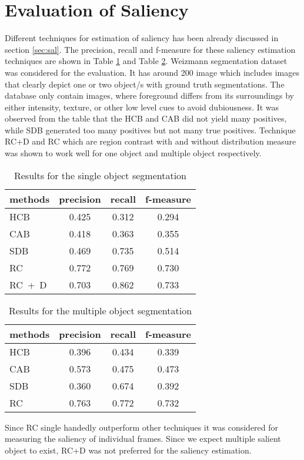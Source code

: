 \section{Evaluation of Saliency}
\label{sec:EvS}
Different techniques for estimation of saliency has been already discussed in section \ref{sec:sal}.  The precision, recall and f-measure for these saliency estimation techniques are shown in Table \ref{tab:salOneObj} and Table \ref{tab:salTwoObj}.  Weizmann segmentation dataset was considered for the evaluation.  It has around 200 image which includes images that clearly depict one or two object/s with ground truth segmentations. The database only contain images, where foreground differs from its surroundings by either intensity, texture, or other low level cues to avoid dubiousness.
It was observed from the table that the HCB and CAB did not yield many positives, while SDB generated too many positives but not many true positives. Technique RC+D and RC which are region contrast with and without distribution measure was shown to work well for one object and multiple object respectively.
\begin{table}[htbp]
   \caption{Results for the single object segmentation}
   \begin{center}
   \begin{tabular}{|l|c|c|c|} \hline
     methods & precision & recall & f-measure \\ \hline
     HCB & 0.425 & 0.312 & 0.294 \\
	 CAB & 0.418 & 0.363 & 0.355 \\
 	 SDB & 0.469 & 0.735 & 0.514 \\
	 RC  & 0.772 & 0.769 & 0.730 \\
	 RC~+~D & 0.703	& 0.862 & 0.733	\\ \hline
   \end{tabular}
   \label{tab:salOneObj}
   \medskip \small 
   \end{center}
 \end{table}
\begin{table}[htbp]
   \caption{Results for the multiple object segmentation}
   \begin{center}
   \begin{tabular}{|l|c|c|c|} \hline
     \textbf{methods} & \textbf{precision} & \textbf{recall} & \textbf{f-measure} \\ \hline
     HCB & 0.396 & 0.434 & 0.339 \\
	 CAB & 0.573 & 0.475 & 0.473 \\
 	 SDB & 0.360 & 0.674 & 0.392 \\
	 RC  & 0.763 & 0.772 & 0.732 \\ \hline
   \end{tabular}
   \label{tab:salTwoObj}
   \end{center}
 \end{table} 
\par Since RC single handedly outperform other techniques it was considered for measuring the saliency of individual frames.  Since we expect multiple salient object to exist, RC+D was not preferred for the saliency estimation.
 
